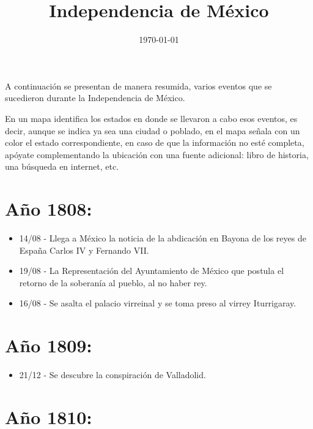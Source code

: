 
\title{\vspace*{-2cm}Independencia de México\vspace{-5ex}}
\date{\today}

\maketitle

A continuación se presentan de manera resumida, varios eventos que se sucedieron durante la Independencia de México.

En un mapa identifica los estados en donde se llevaron a cabo esos eventos, es decir, aunque se indica ya sea una ciudad o poblado, en el mapa señala con un color el estado correspondiente, en caso de que la información no esté completa, apóyate complementando la ubicación con una fuente adicional: libro de historia, una búsqueda en internet, etc.

\section*{Año 1808:}

\begin{itemize}
\item 14/08 - Llega a México la noticia de la abdicación en Bayona de los reyes de España Carlos IV y Fernando VII.
\item 19/08 - La Representación del Ayuntamiento de México que postula el retorno de la soberanía al pueblo, al no haber rey.
\item 16/08 - Se asalta el palacio virreinal y se toma preso al virrey Iturrigaray.
\end{itemize}

\section*{Año 1809:}

\begin{itemize}
\item 21/12 - Se descubre la conspiración de Valladolid.
\end{itemize}

\section*{Año 1810:}

